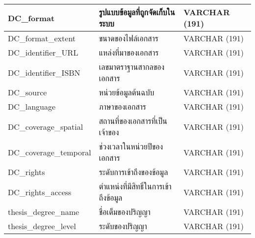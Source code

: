 \begin{longtable}[l]{|l|l|l|}
DC\_format                             & รูปแบบข้อมูลที่ถูกจัดเก็บในระบบ                  & VARCHAR   (191)                                                                   \\ \hline
DC\_format\_extent                     & ขนาดของไฟล์เอกสาร                                & VARCHAR   (191)                                                                   \\ \hline
DC\_identifier\_URL                    & แหล่งที่มาของเอกสาร                              & VARCHAR   (191)                                                                   \\ \hline
DC\_identifier\_ISBN                   & เลขมาตราฐานสากลของเอกสาร                         & VARCHAR   (191)                                                                   \\ \hline
DC\_source                             & หน่วยข้อมูลต้นฉบับ                               & VARCHAR   (191)                                                                   \\ \hline
DC\_language                           & ภาษาของเอกสาร                                    & VARCHAR   (191)                                                                   \\ \hline
DC\_coverage\_spatial                  & สถานที่ของเอกสารที่เป็นเจ้าของ                   & VARCHAR   (191)                                                                   \\ \hline
DC\_coverage\_temporal                 & ช่วงเวลาในหน่วยปีของเอกสาร                       & VARCHAR   (191)                                                                   \\ \hline
DC\_rights                             & ระดับการเข้าถึงของข้อมูล                         & VARCHAR   (191)                                                                   \\ \hline
DC\_rights\_access                     & ตำแหน่งที่มีสิทธิ์ในการเข้าถึงข้อมูล             & VARCHAR   (191)                                                                   \\ \hline
thesis\_degree\_name                   & ชื่อเต็มของปริญญา                                & VARCHAR   (191)                                                                   \\ \hline
thesis\_degree\_level                  & ระดับของปริญญา                                   & VARCHAR   (191)                                                                   \\ \hline

\end{longtable}
